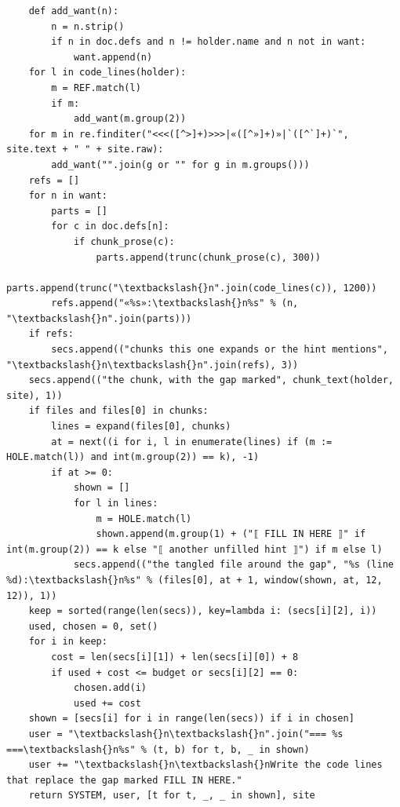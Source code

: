 \documentclass[10pt,a4paper]{article}
\newcounter{chunk}
\begin{document}
\begin{Verbatim}
    def add_want(n):
        n = n.strip()
        if n in doc.defs and n != holder.name and n not in want:
            want.append(n)
    for l in code_lines(holder):
        m = REF.match(l)
        if m:
            add_want(m.group(2))
    for m in re.finditer("<<<([^>]+)>>>|«([^»]+)»|`([^`]+)`", site.text + " " + site.raw):
        add_want("".join(g or "" for g in m.groups()))
    refs = []
    for n in want:
        parts = []
        for c in doc.defs[n]:
            if chunk_prose(c):
                parts.append(trunc(chunk_prose(c), 300))
            parts.append(trunc("\textbackslash{}n".join(code_lines(c)), 1200))
        refs.append("«%s»:\textbackslash{}n%s" % (n, "\textbackslash{}n".join(parts)))
    if refs:
        secs.append(("chunks this one expands or the hint mentions", "\textbackslash{}n\textbackslash{}n".join(refs), 3))
    secs.append(("the chunk, with the gap marked", chunk_text(holder, site), 1))
    if files and files[0] in chunks:
        lines = expand(files[0], chunks)
        at = next((i for i, l in enumerate(lines) if (m := HOLE.match(l)) and int(m.group(2)) == k), -1)
        if at >= 0:
            shown = []
            for l in lines:
                m = HOLE.match(l)
                shown.append(m.group(1) + ("⟦ FILL IN HERE ⟧" if int(m.group(2)) == k else "⟦ another unfilled hint ⟧") if m else l)
            secs.append(("the tangled file around the gap", "%s (line %d):\textbackslash{}n%s" % (files[0], at + 1, window(shown, at, 12, 12)), 1))
    keep = sorted(range(len(secs)), key=lambda i: (secs[i][2], i))
    used, chosen = 0, set()
    for i in keep:
        cost = len(secs[i][1]) + len(secs[i][0]) + 8
        if used + cost <= budget or secs[i][2] == 0:
            chosen.add(i)
            used += cost
    shown = [secs[i] for i in range(len(secs)) if i in chosen]
    user = "\textbackslash{}n\textbackslash{}n".join("=== %s ===\textbackslash{}n%s" % (t, b) for t, b, _ in shown)
    user += "\textbackslash{}n\textbackslash{}nWrite the code lines that replace the gap marked FILL IN HERE."
    return SYSTEM, user, [t for t, _, _ in shown], site
\end{Verbatim}
\end{document}
